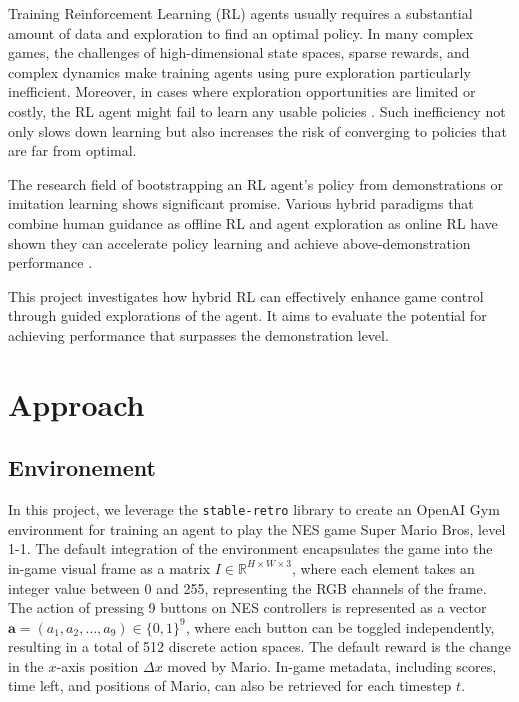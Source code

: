 \documentclass{article}
\begin{document}

Training Reinforcement Learning (RL) agents usually requires a substantial 
amount of data and exploration to find an optimal policy. In many complex 
games, the challenges of high-dimensional state spaces, sparse rewards, and 
complex dynamics make training agents using pure exploration particularly 
inefficient. Moreover, in cases where exploration opportunities are limited or 
costly, the RL agent might fail to learn any usable policies \cite{Coletti2023EffectivenessOW}. 
Such inefficiency not only slows down learning but also increases the risk of 
converging to policies that are far from optimal.

The research field of bootstrapping an RL agent's policy from demonstrations or 
imitation learning shows significant promise. Various hybrid paradigms that 
combine human guidance as offline RL and agent exploration as online RL have 
shown they can accelerate policy learning and achieve above-demonstration 
performance \cite{hester_dqfd_2017,nair_bcrl_overcoming_2018, song_hybrid_2023, 
ren_hybrid_2024, Coletti2023EffectivenessOW}.

This project investigates how hybrid RL can effectively enhance game control 
through guided explorations of the agent. It aims to evaluate the potential for 
achieving performance that surpasses the demonstration level.

\section{Approach}
\subsection{Environement}
In this project, we leverage the \texttt{stable-retro} library to create an OpenAI Gym 
environment for training an agent to play the NES game Super Mario Bros, level 1-1. The 
default integration of the environment encapsulates the game into the in-game visual 
frame as a matrix $I \in \mathbb{R}^{H \times W \times 3}$, where each element takes an 
integer value between 0 and 255, representing the RGB channels of the frame. The action 
of pressing 9 buttons on NES controllers is represented as a vector 
$\mathbf{a} = (a_1, a_2, \dots, a_9) \in \{0, 1\}^9$, where each button can be toggled 
independently, resulting in a total of 512 discrete action spaces. The default reward 
is the change in the $x$-axis position $\Delta x$ moved by Mario. In-game metadata, including 
scores, time left, and positions of Mario, can also be retrieved for each timestep $t$.
\end{document}
